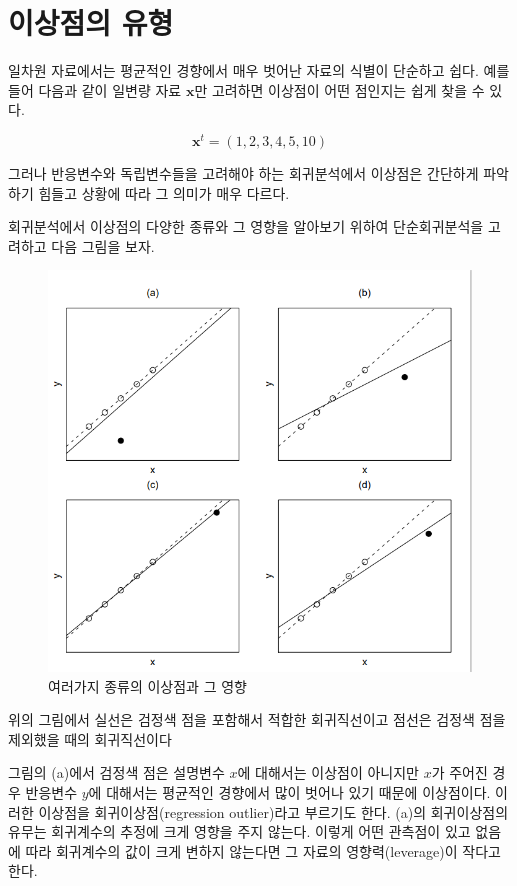 \documentclass[
  10pt,
]{book}
\theoremstyle{definition}
\theoremstyle{definition}
\theoremstyle{definition}
\theoremstyle{definition}
\theoremstyle{remark}
\begin{document}
\hypertarget{uxc774uxc0c1uxc810uxc758-uxc720uxd615}{%
\section{이상점의 유형}\label{uxc774uxc0c1uxc810uxc758-uxc720uxd615}}

일차원 자료에서는 평균적인 경향에서 매우 벗어난 자료의 식별이 단순하고
쉽다. 예를 들어 다음과 같이 일변량 자료 \(\bm x\)만 고려하면 이상점이 어떤
점인지는 쉽게 찾을 수 있다.

\[ \bm x^t = (1,2,3,4,5,10) \]

그러나 반응변수와 독립변수들을 고려해야 하는 회귀분석에서 이상점은
간단하게 파악하기 힘들고 상황에 따라 그 의미가 매우 다르다.

회귀분석에서 이상점의 다양한 종류와 그 영향을 알아보기 위하여
단순회귀분석을 고려하고 다음 그림을 보자.

\begin{figure}
\includegraphics[width=0.8\linewidth]{myimages/outliers} \caption{여러가지 종류의 이상점과 그 영향}\label{fig:outlier}
\end{figure}

위의 그림에서 실선은 검정색 점을 포함해서 적합한 회귀직선이고 점선은
검정색 점을 제외했을 때의 회귀직선이다

그림의 (a)에서 검정색 점은 설명변수 \(x\)에 대해서는 이상점이 아니지만
\(x\)가 주어진 경우 반응변수 \(y\)에 대해서는 평균적인 경향에서 많이 벗어나
있기 때문에 이상점이다. 이러한 이상점을 회귀이상점(regression
outlier)라고 부르기도 한다. (a)의 회귀이상점의 유무는 회귀계수의 추정에
크게 영향을 주지 않는다. 이렇게 어떤 관측점이 있고 없음에 따라
회귀계수의 값이 크게 변하지 않는다면 그 자료의 영향력(leverage)이 작다고
한다.
\end{document}
